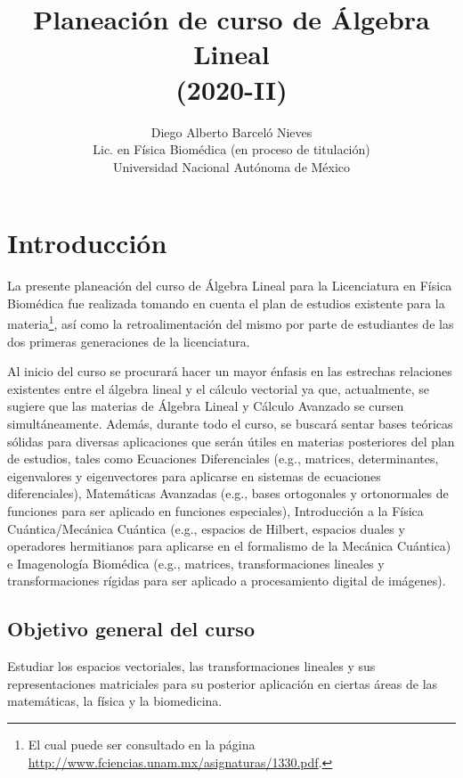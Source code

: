 \documentclass[12pt]{article}
\begin{document}
 
\title{Planeación de curso de Álgebra Lineal \\ (2020-II)}
\author{Diego Alberto Barceló Nieves\\
Lic. en Física Biomédica (en proceso de titulación) \\ Universidad Nacional Autónoma de México}

\maketitle

\section{Introducción}

La presente planeación del curso de Álgebra Lineal para la Licenciatura en Física Biomédica fue realizada tomando en cuenta el plan de estudios existente para la materia\footnote{El cual puede ser consultado en la página \url{http://www.fciencias.unam.mx/asignaturas/1330.pdf}.}, así como la retroalimentación del mismo por parte de estudiantes de las dos primeras generaciones de la licenciatura.

Al inicio del curso se procurará hacer un mayor énfasis en las estrechas relaciones existentes entre el álgebra lineal y el cálculo vectorial ya que, actualmente, se sugiere que las materias de Álgebra Lineal y Cálculo Avanzado se cursen simultáneamente. Además, durante todo el curso, se buscará sentar bases teóricas sólidas para diversas aplicaciones que serán útiles en materias posteriores del plan de estudios, tales como Ecuaciones Diferenciales (e.g., matrices, determinantes, eigenvalores y eigenvectores para aplicarse en sistemas de ecuaciones diferenciales), Matemáticas Avanzadas (e.g., bases ortogonales y ortonormales de funciones para ser aplicado en funciones especiales), Introducción a la Física Cuántica/Mecánica Cuántica (e.g., espacios de Hilbert, espacios duales y operadores hermitianos para aplicarse en el formalismo de la Mecánica Cuántica) e Imagenología Biomédica (e.g., matrices, transformaciones lineales y transformaciones rígidas para ser aplicado a procesamiento digital de imágenes).


\subsection{Objetivo general del curso}

Estudiar los espacios vectoriales, las transformaciones lineales y sus representaciones matriciales para su posterior aplicación en ciertas áreas de las matemáticas, la física y la biomedicina.
\end{document}

